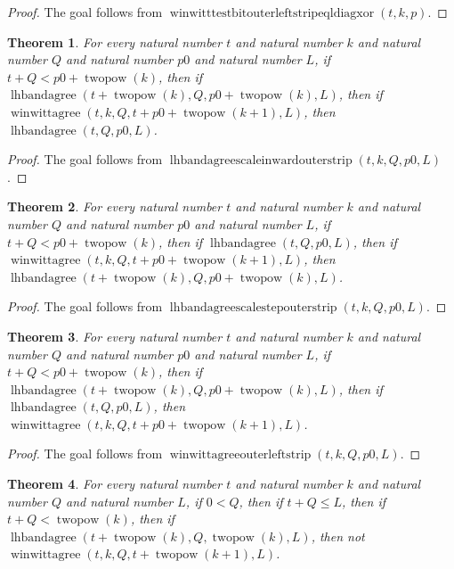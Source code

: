 \documentclass[11pt]{article}
\newtheorem{theorem}{Theorem}[section]
\theoremstyle{definition}
\begin{document}
\begin{proof}
The goal follows from \(\operatorname{winwitttestbitouterleftstripeqldiagxor}(t, k, p)\).
\end{proof}
\begin{theorem}
\label{ll:paper:lhbandagree-scale-inward-outer-strip}
For every natural number \(t\) and natural number \(k\) and natural number \(Q\) and natural number \(p0\) and natural number \(L\), if \(t + Q < p0 + \operatorname{twopow}(k)\), then if \(\operatorname{lhbandagree}(t + \operatorname{twopow}(k), Q, p0 + \operatorname{twopow}(k), L)\), then if \(\operatorname{winwittagree}(t, k, Q, t + p0 + \operatorname{twopow}(k + 1), L)\), then \(\operatorname{lhbandagree}(t, Q, p0, L)\).
\end{theorem}
\begin{proof}
The goal follows from \(\operatorname{lhbandagreescaleinwardouterstrip}(t, k, Q, p0, L)\).
\end{proof}
\begin{theorem}
\label{ll:paper:lhbandagree-scale-step-outer-strip}
For every natural number \(t\) and natural number \(k\) and natural number \(Q\) and natural number \(p0\) and natural number \(L\), if \(t + Q < p0 + \operatorname{twopow}(k)\), then if \(\operatorname{lhbandagree}(t, Q, p0, L)\), then if \(\operatorname{winwittagree}(t, k, Q, t + p0 + \operatorname{twopow}(k + 1), L)\), then \(\operatorname{lhbandagree}(t + \operatorname{twopow}(k), Q, p0 + \operatorname{twopow}(k), L)\).
\end{theorem}
\begin{proof}
The goal follows from \(\operatorname{lhbandagreescalestepouterstrip}(t, k, Q, p0, L)\).
\end{proof}
\begin{theorem}
\label{ll:paper:winwittagree-outer-left-strip}
For every natural number \(t\) and natural number \(k\) and natural number \(Q\) and natural number \(p0\) and natural number \(L\), if \(t + Q < p0 + \operatorname{twopow}(k)\), then if \(\operatorname{lhbandagree}(t + \operatorname{twopow}(k), Q, p0 + \operatorname{twopow}(k), L)\), then if \(\operatorname{lhbandagree}(t, Q, p0, L)\), then \(\operatorname{winwittagree}(t, k, Q, t + p0 + \operatorname{twopow}(k + 1), L)\).
\end{theorem}
\begin{proof}
The goal follows from \(\operatorname{winwittagreeouterleftstrip}(t, k, Q, p0, L)\).
\end{proof}
\begin{theorem}
\label{ll:paper:not-lhbandagree-and-winwittagree-of-lt-twopow}
For every natural number \(t\) and natural number \(k\) and natural number \(Q\) and natural number \(L\), if \(0 < Q\), then if \(t + Q \le L\), then if \(t + Q < \operatorname{twopow}(k)\), then if \(\operatorname{lhbandagree}(t + \operatorname{twopow}(k), Q, \operatorname{twopow}(k), L)\), then not \(\operatorname{winwittagree}(t, k, Q, t + \operatorname{twopow}(k + 1), L)\).
\end{theorem}
\end{document}
